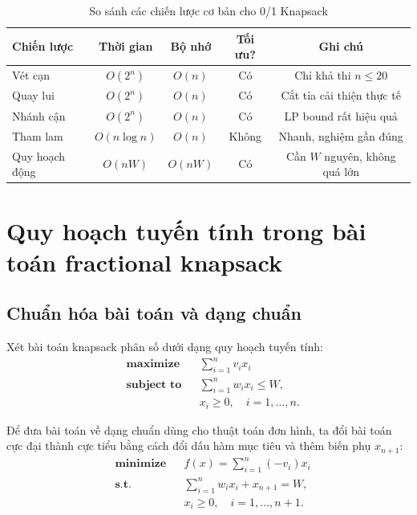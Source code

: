 \begin{table}[H]
\centering
\begin{tabular}{l|cccc}
\toprule
\textbf{Chiến lược} & \textbf{Thời gian} & \textbf{Bộ nhớ} & \textbf{Tối ưu?} & \textbf{Ghi chú} \\
\midrule
Vét cạn & $O(2^n)$ & $O(n)$ & Có & Chỉ khả thi $n \leq 20$ \\
Quay lui & $O(2^n)$ & $O(n)$ & Có & Cắt tỉa cải thiện thực tế \\
Nhánh cận & $O(2^n)$ & $O(n)$ & Có & LP bound rất hiệu quả \\
Tham lam & $O(n \log n)$ & $O(n)$ & Không & Nhanh, nghiệm gần đúng \\
Quy hoạch động & $O(nW)$ & $O(nW)$ & Có & Cần $W$ nguyên, không quá lớn \\
\bottomrule
\end{tabular}
\caption{So sánh các chiến lược cơ bản cho 0/1 Knapsack}
\label{tab:compare_strategies}
\end{table}


\section{Quy hoạch tuyến tính trong bài toán fractional knapsack}

\subsection{Chuẩn hóa bài toán và dạng chuẩn}

Xét bài toán knapsack phân số dưới dạng quy hoạch tuyến tính:
\[
\begin{aligned}
& \textbf{maximize} && \sum_{i=1}^{n} v_i x_i \\
& \textbf{subject to} && \sum_{i=1}^{n} w_i x_i \le W, \\
& && x_i \ge 0,\quad i=1,\dots,n.
\end{aligned}
\]

Để đưa bài toán về dạng chuẩn dùng cho thuật toán đơn hình, ta đổi bài toán cực đại thành cực tiểu bằng cách đổi dấu hàm mục tiêu và thêm biến phụ $x_{n+1}$:
\[
\begin{aligned}
& \textbf{minimize} && f(x)=\sum_{i=1}^{n} (-v_i)x_i \\
& \textbf{s.t.} && \sum_{i=1}^{n} w_i x_i + x_{n+1}=W, \\
& && x_i \ge 0,\quad i=1,\dots,n+1.
\end{aligned}
\]

